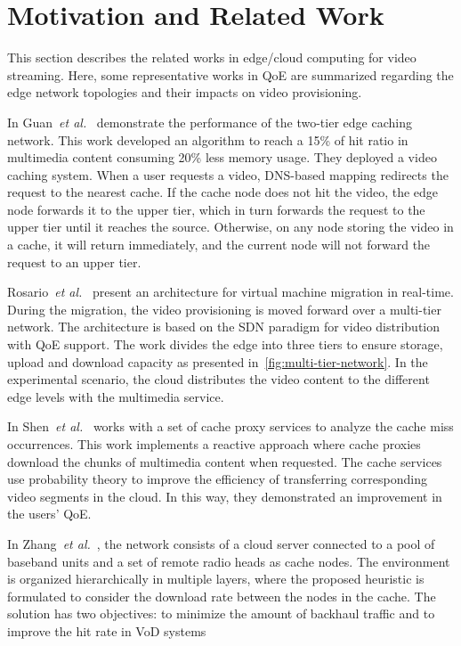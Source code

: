 \section{Motivation and Related Work}
\label{sec:related-work}

This section describes the related works in edge/cloud computing for video streaming. Here, some representative works in QoE are summarized regarding the edge network topologies and their impacts on video provisioning.

In Guan~\textit{et al.}~\cite{guan:2019:CLC} demonstrate the performance of the two-tier edge caching network. This work developed an algorithm to reach a 15\% of hit ratio in multimedia content consuming 20\% less memory usage. They deployed a video caching system. When a user requests a video, DNS-based mapping redirects the request to the nearest cache.
If the cache node does not hit the video, the edge node forwards it to the upper tier, which in turn forwards the request to the upper tier until it reaches the source. Otherwise, on any node storing the video in a cache, it will return immediately, and the current node will not forward the request to an upper tier.

Rosario~\textit{et al.}~\cite{rosarioSENSORS2018} present an architecture for virtual machine migration in real-time. During the migration, the video provisioning is moved forward over a multi-tier network. The architecture is based on the SDN paradigm for video distribution with QoE support. The work divides the edge into three tiers to ensure storage, upload and download capacity as presented in~\ref{fig:multi-tier-network}. In the experimental scenario, the cloud distributes the video content to the different edge levels with the multimedia service.

In Shen~\textit{et al.}~\cite{shenIWQoS19} works with a set of cache proxy services to analyze the cache miss occurrences. This work implements a reactive approach where cache proxies download the chunks of multimedia content when requested. The cache services use probability theory to improve the efficiency of transferring corresponding video segments in the cloud. In this way, they demonstrated an improvement in the users' QoE.

In Zhang~\textit{et al.}~\cite{zhang:WCNC2017}, the network consists of a cloud server connected to a pool of baseband units and a set of remote radio heads as cache nodes. The environment is organized hierarchically in multiple layers, where the proposed heuristic is formulated to consider the download rate between the nodes in the cache. The solution has two objectives: to minimize the amount of backhaul traffic and to improve the hit rate in VoD systems

